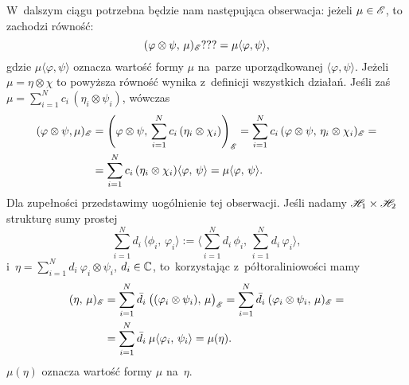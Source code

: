 \documentclass[a4paper,11pt]{article}
\begin{document}
W~dalszym ciągu potrzebna będzie nam następująca obserwacja: jeżeli
$\mu \in \mathcal{E}$, to zachodzi równość:
\begin{equation}
  \label{eq:RS-Vol-I-s01-33}
  ( \varphi \otimes \psi, \, \mu )_{ \mathcal{E} } ??? = \mu\langle \varphi, \psi \rangle,
\end{equation}
gdzie $\mu\langle \varphi,  \psi \rangle$ oznacza wartość formy $\mu$ na~parze
uporządkowanej $\langle \varphi, \psi \rangle$. Jeżeli $\mu = \eta \otimes \chi$ to
powyższa równość wynika z~definicji wszystkich działań. Jeśli zaś
$\mu = \sum_{ i = 1 }^{ N } c_{ i } \, ( \eta_{ i } \otimes \psi_{ i } )$,
wówczas
\begin{equation}
  \label{eq:RS-Vol-I-s01-34}
  \begin{split}
    ( \varphi \otimes \psi, \mu )_{ \mathcal{E} }
    &=
      \left( \varphi \otimes \psi, \, \sum_{ i = 1 }^{ N } c_{ i } \,
      ( \eta_{ i } \otimes \chi_{ i } ) \right)_{ \mathcal{E} }
      =
      \sum_{ i = 1 }^{ N } c_{ i } \,
      ( \varphi \otimes \psi, \, \eta_{ i } \otimes \chi_{ i } )_{ \mathcal{E} } = \\
    &=
      \sum_{ i = 1 }^{ N } c_{ i } \, ( \eta_{ i } \otimes \chi_{ i } )
      \langle \varphi, \, \psi \rangle
      = \mu\langle \varphi, \, \psi \rangle.
  \end{split}
\end{equation}
Dla zupełności przedstawimy uogólnienie tej obserwacji. Jeśli nadamy
$\mathcal{H}_{ 1 } \times \mathcal{H}_{ 2 }$ strukturę sumy prostej
\begin{equation}
  \label{eq:RS-Vol-I-s01-35}
  \sum_{ i = 1 }^{ N } d_{ i } \, \langle \phi_{ i }, \, \varphi_{ i } \rangle
  :=
  \langle \sum_{ i = 1 }^{ N } d_{ i } \, \phi_{ i }, \,
  \sum_{ i = 1 }^{ N } d_{ i } \, \varphi_{ i } \rangle,
\end{equation}
i~$\eta = \sum_{ i = 1 }^{ N } d_{ i } \: \varphi_{ i } \otimes \psi_{ i }$,
$d_{ i } \in \mathbb{C}$, to~korzystając z~półtoraliniowości mamy
\begin{equation}
  \label{eq:RS-Vol-I-s01-36}
  \begin{split}
    ( \eta, \, \mu )_{ \mathcal{E} }
    &=
      \sum_{ i = 1 }^{ N } \bar{ d }_{ i } \:
      \big( ( \varphi_{ i } \otimes \psi_{ i } ), \, \mu \big)_{ \mathcal{E} }
      =
      \sum_{ i = 1 }^{ N } \bar{ d }_{ i } \:
    ( \varphi_{ i } \otimes \psi_{ i }, \, \mu )_{ \mathcal{E} } = \\
    &=
      \sum_{ i = 1 }^{ N } \bar{ d }_{ i } \: \mu \langle \varphi_{ i }, \, \psi_{ i } \rangle
      = \mu( \eta ).
  \end{split}
\end{equation}
$\mu( \eta )$ oznacza wartość formy $\mu$ na~$\eta$.
\end{document}
